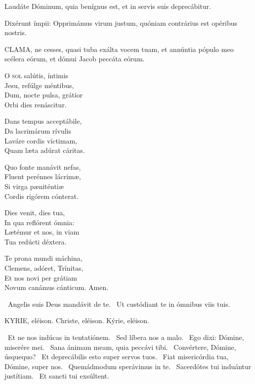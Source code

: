  Laudáte Dóminum, quia benígnus est, et in servis suis deprecábitur.


 Dixérunt ímpii: Opprimámus virum justum, quóniam contrárius est opéribus nostris.



\lettrine[lines=2]{C}{LAMA}, ne cesses, quasi tuba exálta vocem tuam, et annúntia pópulo meo scélera eórum, et dómui Jacob peccáta eórum.


\lettrine[lines=2]{O}{} \textsc{sol} salútis, íntimis\\
Jesu, refúlge méntibus,\\
Dum, nocte pulsa, grátior\\
Orbi dies renáscitur.

Dans tempus acceptábile,\\
Da lacrimárum rívulis\\
Laváre cordis víctimam,\\
Quam læta adúrat cáritas.

Quo fonte manávit nefas,\\
Fluent perénnes lácrimæ,\\
Si virga pæniténtiæ\\
Cordis rigórem cónterat.

Dies venit, dies tua,\\
In qua reflórent ómnia:\\
Lætémur et nos, in viam\\
Tua redúcti déxtera.

Te prona mundi máchina,\\
Clemens, adóret, Trínitas,\\
Et nos novi per grátiam\\
Novum canámus cánticum. Amen.

\V\ Angelis suis Deus mandávit de te. \R\ Ut custódiant te in ómnibus viis tuis.




KYRIE, eléison. Christe, eléison. Kýrie, eléison.

 \V\ Et ne nos indúcas in tentatiónem. \R\ Sed líbera nos a malo. \V\ Ego dixi: Dómine, miserére mei. \R\ Sana ánimam meam, quia peccávi tibi. \V\ Convértere, Dómine, úsquequo? \R\ Et deprecábilis esto super servos tuos. \V\ Fiat misericórdia tua, Dómine, super nos. \R\ Quemádmodum sperávimus in te. \V\ Sacerdótes tui induántur justítiam. \R\ Et sancti tui exsúltent.

